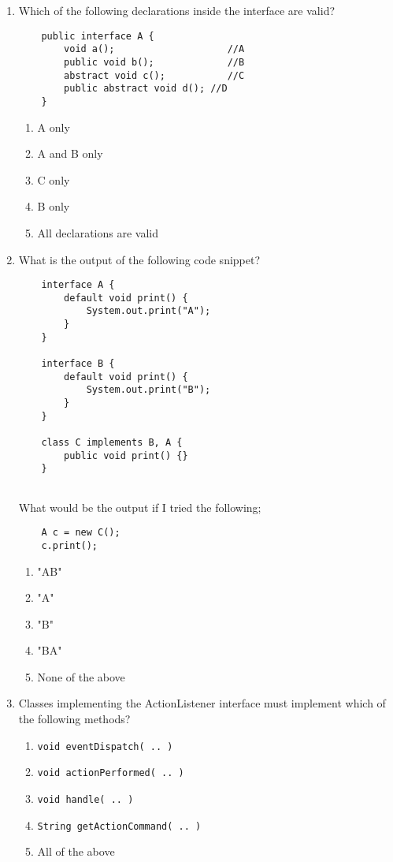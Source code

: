 \documentclass[S17-Final.tex]{subfiles}
\begin{document}
\begin{enumerate}
\item Which of the following declarations inside the interface are valid?
\begin{lstlisting}
    public interface A {
        void a();                    //A
        public void b();             //B
        abstract void c();           //C
        public abstract void d(); //D
    }
\end{lstlisting}
	
\begin{enumerate}
\item  A only
\item  A and B only
\item  C only
\item  B only
\item  All declarations are valid \ifdraft \Ans \fi 
\end{enumerate}
\clearpage
\item What is the output of the following code snippet?
\begin{lstlisting}
    interface A {
        default void print() {
            System.out.print("A");
        }
    }

    interface B {
        default void print() {
            System.out.print("B");
        }
    }
    
    class C implements B, A {
        public void print() {}
    }
 
\end{lstlisting}
What would be the output if I tried the following;
\begin{lstlisting}
    A c = new C();
    c.print();
\end{lstlisting}
\begin{enumerate}
\item  "AB"
\item  "A"
\item  "B"
\item  "BA"
\item  None of the above \ifdraft \Ans \fi 
\end{enumerate}

\item Classes implementing the ActionListener interface must implement which of the following methods?

\begin{enumerate}
\item  \texttt{void eventDispatch( .. )}
\item  \texttt{void actionPerformed( .. )} \ifdraft \Ans \fi 
\item  \texttt{void handle( .. )}
\item  \texttt{String getActionCommand( .. )}
\item  All of the above
\end{enumerate}
\clearpage


\end{enumerate}
\end{document}
